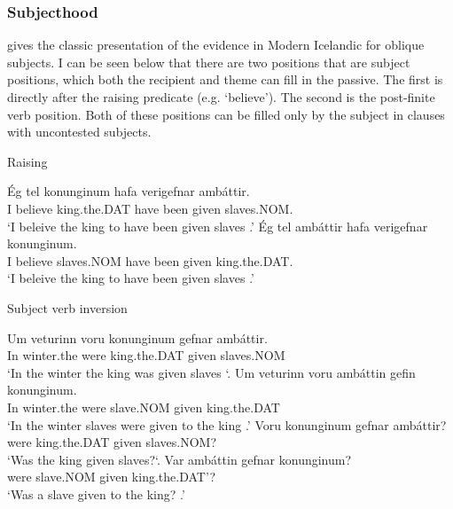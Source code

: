 \subsubsection{Subjecthood}
\cite{Zaenen.1985} gives the classic presentation of the evidence in Modern Icelandic for oblique subjects. I can be seen below that there are two positions that are subject positions, which both the recipient and theme can fill in the passive. The first is directly after the raising predicate (e.g. `believe'). The second is the post-finite verb position. Both of these positions can be filled only by the subject in clauses with uncontested subjects.
\begin{exe}
\ex 
\begin{xlist}
\ex Raising
\begin{xlist}
\ex \gll \'{E}g tel konunginum hafa veri\dh gefnar amb\'{a}ttir.\\
I believe king.the.DAT have been given slaves.NOM.\\
\trans `I beleive the king to have been given slaves \citep{Zaenen.1985}.'
\ex \gll \'{E}g tel amb\'{a}ttir hafa veri\dh gefnar konunginum.\\
I believe slaves.NOM have been given king.the.DAT.\\
\trans `I beleive the king to have been given slaves \citep{Zaenen.1985}.'
\end{xlist}
\ex Subject verb inversion
\begin{xlist}
\ex \gll Um veturinn voru konunginum gefnar amb\'{a}ttir.\\
In winter.the were king.the.DAT given slaves.NOM\\
\trans `In the winter the king was given slaves `\citep{Zaenen.1985}.
\ex \gll Um veturinn voru amb\'{a}ttin gefin konunginum.\\
In winter.the were slave.NOM given king.the.DAT\\
\trans `In the winter slaves were given to the king \citep{Zaenen.1985}.'
\ex \gll Voru konunginum gefnar amb\'{a}ttir?\\
were king.the.DAT given slaves.NOM?\\
\trans `Was the king given slaves?`\citep{Zaenen.1985}.
\ex \gll Var amb\'{a}ttin gefnar konunginum?\\
were slave.NOM given king.the.DAT'?\\
\trans `Was a slave given to the king? \citep{Zaenen.1985}.'
\end{xlist}
\end{xlist}
\end{exe}
